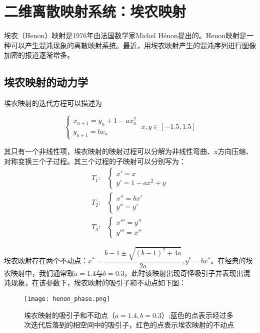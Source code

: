 \section{二维离散映射系统：埃农映射}
埃农（Henon）映射是1976年由法国数学家Michel H\'{e}non提出的。Henon映射是一种可以产生混沌现象的离散映射系统。最近，用埃农映射产生的混沌序列进行图像加密的报道逐渐增多。
\subsection{埃农映射的动力学}

埃农映射的迭代方程可以描述为

\begin{equation}
    \begin{cases}
        x_{n+1}=y_n+1-ax_n^2\\
        y_{n+1}=bx_n
    \end{cases}\ x,y\in [-1.5,1.5]
\end{equation}

其只有一个非线性项，埃农映射的映射过程可以分解为非线性弯曲、x方向压缩、对称变换三个子过程。其三个过程的子映射可以分别写为：
\begin{equation}
    \begin{aligned}
        T_1: & \begin{cases}
            x'=x\\
            y'=1-ax^2+y
        \end{cases}\\
        T_2: & \begin{cases}
            x''=bx'\\
            y''=y'
        \end{cases}\\
        T_3: & \begin{cases}
            x'''=y''\\
            y'''=x''
        \end{cases}
    \end{aligned}
\end{equation}

埃农映射存在两个不动点：$x^*=\dfrac{b-1\pm\sqrt{(b-1)^2+4a}}{2a},y^*=bx^*$。在经典的埃农映射中，我们通常取$a=1.4$与$b=0.3$，此时该映射出现奇怪吸引子并表现出混沌现象，在该参数下，埃农映射的吸引子和不动点如下图：
\begin{figure}
	\centering
	\texttt{[image: henon\_phase.png]}
    \caption[埃农映射的吸引子和不动点]{埃农映射的吸引子和不动点（$a=1.4,b=0.3$）:蓝色的点表示经过多次迭代后落到的相空间中的吸引子，红色的点表示埃农映射的不动点}
    \label{fig:logi_lypn}
\end{figure}

